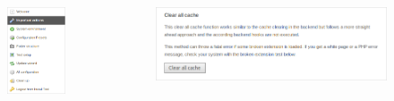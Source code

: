 \begin{frame}[fragile]
	\begin{columns}[T]
		\begin{column}{.4\textwidth}
			\begin{figure}\vspace*{-0.4cm}
				\includegraphics[width=0.7\linewidth]{Images/InstallTool/ImportantActions.png}
			\end{figure}
		\end{column}
		\begin{column}{.6\textwidth}
			\begin{figure}
				\includegraphics[width=0.9\linewidth]{Images/InstallTool/ClearAllCache.png}
			\end{figure}
		\end{column}
	\end{columns}

\end{frame}

